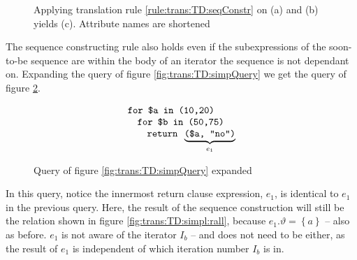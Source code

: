 \begin{myExample}
\begin{figure}[!h]
\caption[Example: constructing a sequence]{Applying translation rule \ref{rule:trans:TD:seqConstr} on (a) and (b)
yields (c). Attribute names are shortened \label{fig:trans:TD:simpleSeq}}
\end{figure}

The sequence constructing rule also holds even if the subexpressions of the soon-to-be sequence are within the
body of an iterator the sequence is not dependant on. Expanding the query of figure \ref{fig:trans:TD:simpQuery}
we get the query of figure \ref{fig:trans:TD:expandQuery}. 
\begin{figure}[h]
\begin{equation*}
\begin{array}{l}
\mbox{\texttt{for \$a in (10,20)}} \\ \quad
\mbox{\texttt{for \$b in (50,75)}} \\ \quad \quad
\mbox{\texttt{return }} \underbrace{ \mbox{\texttt{(\$a, "no")}} }_{e_{1}}
\end{array}
\end{equation*}
\caption{Query of figure \ref{fig:trans:TD:simpQuery} expanded}
\label{fig:trans:TD:expandQuery}
\end{figure}
In this query, notice the innermost return clause expression, $e_{1}$, is identical to $e_{1}$ in the previous
query. Here, the result of the sequence construction will still be the relation shown in figure
\ref{fig:trans:TD:simpl:rall}, because $e_{1}.\vartheta=\left\{a\right\}$ -- also as before. $e_{1}$ is not aware
of the iterator $I_{b}$ -- and does not need to be either, as the result of $e_{1}$ is independent of which
iteration number $I_{b}$ is in.

\end{myExample}
